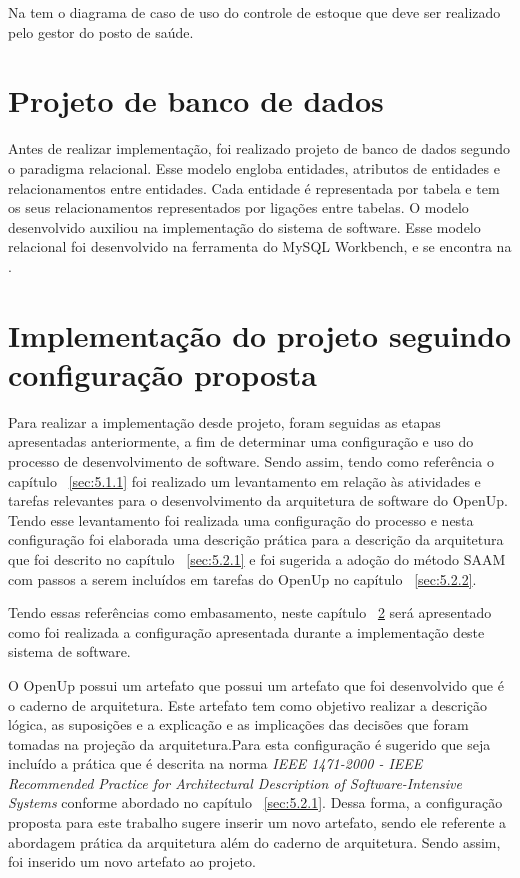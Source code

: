 Na  tem o diagrama de caso de uso do controle de estoque que deve ser realizado pelo gestor do posto de saúde.

%

\section{Projeto de banco de dados}
Antes de realizar implementação, foi realizado projeto de banco de dados segundo o paradigma relacional. Esse modelo engloba entidades, atributos de entidades e relacionamentos entre  entidades. Cada entidade é representada por tabela e tem os seus relacionamentos representados por ligações entre tabelas. O modelo desenvolvido auxiliou na implementação do sistema de software. Esse modelo relacional foi desenvolvido na ferramenta do MySQL Workbench, e se encontra na  .


%


\section{Implementação do projeto seguindo configuração proposta}
\label{sec:implementação}
Para realizar a implementação desde projeto, foram seguidas as etapas apresentadas anteriormente, a fim de determinar uma configuração e uso do processo de desenvolvimento de software.
Sendo assim, tendo como referência o capítulo  ~\ref{sec:5.1.1} foi realizado um levantamento em relação às atividades e tarefas relevantes para o desenvolvimento da arquitetura de software do \acrfull{OpenUp}. Tendo esse levantamento foi realizada uma configuração do processo e nesta configuração foi elaborada uma descrição prática para a descrição da arquitetura que foi descrito no capítulo ~\ref{sec:5.2.1} e foi sugerida a adoção do método \acrfull{SAAM} com passos a serem incluídos em tarefas do \acrfull{OpenUp} no capítulo ~\ref{sec:5.2.2}. 

Tendo essas referências como embasamento, neste capítulo ~\ref{sec:implementação} será apresentado como foi realizada a configuração apresentada durante a implementação deste sistema de software.

O \acrfull{OpenUp} possui um artefato que possui um artefato que foi desenvolvido que é o caderno de arquitetura. Este artefato tem como objetivo realizar a descrição lógica, as suposições e a explicação e as implicações das decisões que foram tomadas na projeção da arquitetura\cite{openup}.Para esta configuração é sugerido que seja incluído a prática que é descrita na norma \emph{IEEE 1471-2000 - IEEE Recommended Practice for Architectural Description of Software-Intensive Systems} conforme abordado no capítulo ~\ref{sec:5.2.1}. Dessa forma, a configuração proposta para este trabalho sugere inserir um novo artefato, sendo ele referente a abordagem prática da arquitetura além do caderno de arquitetura. Sendo assim, foi inserido um novo artefato ao projeto.

